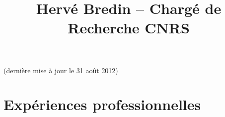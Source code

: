 \documentclass{simplecv}
\begin{document}
\pagestyle{empty}



\title{Herv\'{e} Bredin -- Charg\'{e} de Recherche CNRS}

\maketitle

\vspace{-.5cm}
\begin{center}
(derni\`{e}re mise \`{a} jour le 31 ao\^ut 2012)
\end{center}

\section{Exp\'{e}riences professionnelles}
\end{document}

